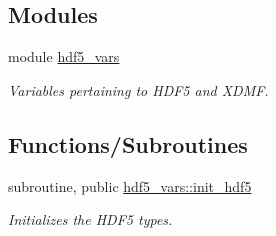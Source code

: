 \subsection*{Modules}
\begin{DoxyCompactItemize}
\item 
module \hyperlink{namespacehdf5__vars}{hdf5\+\_\+vars}
\begin{DoxyCompactList}\small\item\em Variables pertaining to H\+D\+F5 and X\+D\+MF. \end{DoxyCompactList}\end{DoxyCompactItemize}
\subsection*{Functions/\+Subroutines}
\begin{DoxyCompactItemize}
\item 
subroutine, public \hyperlink{namespacehdf5__vars_ab644703bcb67ce423732e39ab56a4b63}{hdf5\+\_\+vars\+::init\+\_\+hdf5}
\begin{DoxyCompactList}\small\item\em Initializes the H\+D\+F5 types. \end{DoxyCompactList}\end{DoxyCompactItemize}
